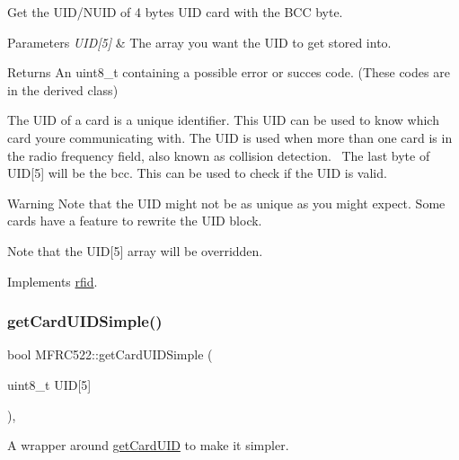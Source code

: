 Get the U\+I\+D/\+N\+U\+ID of 4 bytes U\+ID card with the B\+CC byte. 


\begin{DoxyParams}{Parameters}
{\em U\+I\+D\mbox{[}5\mbox{]}} & The array you want the U\+ID to get stored into. \\
\hline
\end{DoxyParams}
\begin{DoxyReturn}{Returns}
An uint8\+\_\+t containing a possible error or succes code. (These codes are in the derived class)
\end{DoxyReturn}
The U\+ID of a card is a unique identifier. This U\+ID can be used to know which card you\textquotesingle{}re communicating with. The U\+ID is used when more than one card is in the radio frequency field, also known as collision detection.~\newline
 The last byte of U\+ID\mbox{[}5\mbox{]} will be the bcc. This can be used to check if the U\+ID is valid. \begin{DoxyWarning}{Warning}
Note that the U\+ID might not be as unique as you might expect. Some cards have a feature to rewrite the U\+ID block. 

Note that the U\+ID\mbox{[}5\mbox{]} array will be overridden. 
\end{DoxyWarning}


Implements \mbox{\hyperlink{classrfid_afeb2a321694ceaf84db793f5efb3a750}{rfid}}.

\mbox{\label{class_m_f_r_c522_a33c20be6030f635d986984db4999a1eb}} 
\subsubsection{\texorpdfstring{get\+Card\+U\+I\+D\+Simple()}{getCardUIDSimple()}}
{\footnotesize\ttfamily bool M\+F\+R\+C522\+::get\+Card\+U\+I\+D\+Simple (\begin{DoxyParamCaption}\item[{uint8\+\_\+t}]{U\+ID\mbox{[}5\mbox{]} }\end{DoxyParamCaption})\hspace{0.3cm}{\ttfamily [override]}, {\ttfamily [virtual]}}



A wrapper around \mbox{\hyperlink{class_m_f_r_c522_ad3c7ab4c70988e80c400f36f724a12b7}{get\+Card\+U\+ID}} to make it simpler. 


